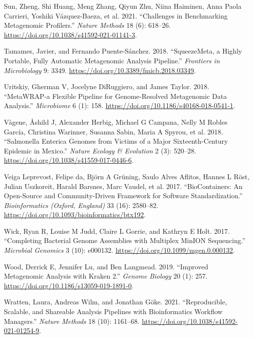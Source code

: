 \documentclass[
]{article}
\newlength{\cslhangindent}
\newlength{\cslentryspacingunit} %
\newenvironment{CSLReferences}[2] %
 {%
  \setlength{\parindent}{0pt}
  \ifodd #1
  \let\oldpar\par
  \def\par{\hangindent=\cslhangindent\oldpar}
  \fi
  \setlength{\parskip}{#2\cslentryspacingunit}
 }%
 {}
\begin{document}
\begin{CSLReferences}{1}{0}
\leavevmode{}%
Sun, Zheng, Shi Huang, Meng Zhang, Qiyun Zhu, Niina Haiminen, Anna Paola
Carrieri, Yoshiki Vázquez-Baeza, et al. 2021. {``Challenges in
Benchmarking Metagenomic Profilers.''} \emph{Nature Methods} 18 (6):
618--26. \url{https://doi.org/10.1038/s41592-021-01141-3}.

\leavevmode{}%
Tamames, Javier, and Fernando Puente-Sánchez. 2018. {``{SqueezeMeta}, a
Highly Portable, Fully Automatic Metagenomic Analysis Pipeline.''}
\emph{Frontiers in Microbiology} 9: 3349.
\url{https://doi.org/10.3389/fmicb.2018.03349}.

\leavevmode{}%
Uritskiy, Gherman V, Jocelyne DiRuggiero, and James Taylor. 2018.
{``{MetaWRAP}-a Flexible Pipeline for Genome-Resolved Metagenomic Data
Analysis.''} \emph{Microbiome} 6 (1): 158.
\url{https://doi.org/10.1186/s40168-018-0541-1}.

\leavevmode{}%
Vågene, Åshild J, Alexander Herbig, Michael G Campana, Nelly M Robles
García, Christina Warinner, Susanna Sabin, Maria A Spyrou, et al. 2018.
{``Salmonella Enterica Genomes from Victims of a Major Sixteenth-Century
Epidemic in Mexico.''} \emph{Nature Ecology \& Evolution} 2 (3):
520--28. \url{https://doi.org/10.1038/s41559-017-0446-6}.

\leavevmode{}%
Veiga Leprevost, Felipe da, Björn A Grüning, Saulo Alves Aflitos, Hannes
L Röst, Julian Uszkoreit, Harald Barsnes, Marc Vaudel, et al. 2017.
{``{BioContainers}: An Open-Source and Community-Driven Framework for
Software Standardization.''} \emph{Bioinformatics (Oxford, England)} 33
(16): 2580--82. \url{https://doi.org/10.1093/bioinformatics/btx192}.

\leavevmode{}%
Wick, Ryan R, Louise M Judd, Claire L Gorrie, and Kathryn E Holt. 2017.
{``Completing Bacterial Genome Assemblies with Multiplex {MinION}
Sequencing.''} \emph{Microbial Genomics} 3 (10): e000132.
\url{https://doi.org/10.1099/mgen.0.000132}.

\leavevmode{}%
Wood, Derrick E, Jennifer Lu, and Ben Langmead. 2019. {``Improved
Metagenomic Analysis with Kraken 2.''} \emph{Genome Biology} 20 (1):
257. \url{https://doi.org/10.1186/s13059-019-1891-0}.

\leavevmode{}%
Wratten, Laura, Andreas Wilm, and Jonathan Göke. 2021. {``Reproducible,
Scalable, and Shareable Analysis Pipelines with Bioinformatics Workflow
Managers.''} \emph{Nature Methods} 18 (10): 1161--68.
\url{https://doi.org/10.1038/s41592-021-01254-9}.


\end{CSLReferences}
\end{document}
